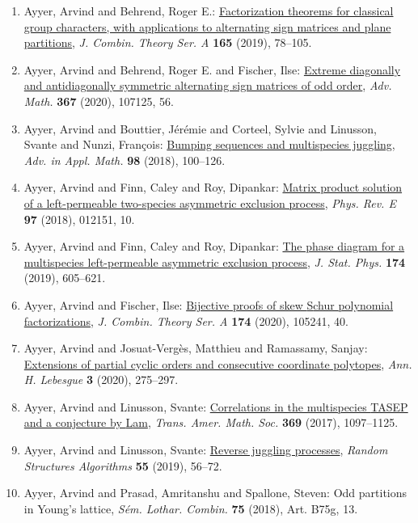 \begin{enumerate}
\item Ayyer, Arvind and Behrend, Roger E.: \href{https://doi.org/10.1016/j.jcta.2019.01.001}{Factorization theorems for classical group characters, with
applications to alternating sign matrices and plane
partitions}, \emph{J. Combin. Theory Ser. A} {\bf 165} (2019), 78--105.
\item Ayyer, Arvind and Behrend, Roger E. and Fischer, Ilse: \href{https://doi.org/10.1016/j.aim.2020.107125}{Extreme diagonally and antidiagonally symmetric alternating
sign matrices of odd order}, \emph{Adv. Math.} {\bf 367} (2020), 107125, 56.
\item Ayyer, Arvind and Bouttier, J\'{e}r\'{e}mie and Corteel, Sylvie and
Linusson, Svante and Nunzi, Fran\c{c}ois: \href{https://doi.org/10.1016/j.aam.2018.03.001}{Bumping sequences and multispecies juggling}, \emph{Adv. in Appl. Math.} {\bf 98} (2018), 100--126.
\item Ayyer, Arvind and Finn, Caley and Roy, Dipankar: \href{https://doi.org/10.1103/physreve.97.012151}{Matrix product solution of a left-permeable two-species
asymmetric exclusion process}, \emph{Phys. Rev. E} {\bf 97} (2018), 012151, 10.
\item Ayyer, Arvind and Finn, Caley and Roy, Dipankar: \href{https://doi.org/10.1007/s10955-018-2183-x}{The phase diagram for a multispecies left-permeable asymmetric
exclusion process}, \emph{J. Stat. Phys.} {\bf 174} (2019), 605--621.
\item Ayyer, Arvind and Fischer, Ilse: \href{https://doi.org/10.1016/j.jcta.2020.105241}{Bijective proofs of skew {S}chur polynomial factorizations}, \emph{J. Combin. Theory Ser. A} {\bf 174} (2020), 105241, 40.
\item Ayyer, Arvind and Josuat-Verg\`es, Matthieu and Ramassamy,
Sanjay: \href{https://doi.org/10.5802/ahl.33}{Extensions of partial cyclic orders and consecutive coordinate
polytopes}, \emph{Ann. H. Lebesgue} {\bf 3} (2020), 275--297.
\item Ayyer, Arvind and Linusson, Svante: \href{https://doi.org/10.1090/tran/6806}{Correlations in the multispecies {TASEP} and a conjecture by
{L}am}, \emph{Trans. Amer. Math. Soc.} {\bf 369} (2017), 1097--1125.
\item Ayyer, Arvind and Linusson, Svante: \href{https://doi.org/10.1002/rsa.20825}{Reverse juggling processes}, \emph{Random Structures Algorithms} {\bf 55} (2019), 56--72.
\item Ayyer, Arvind and Prasad, Amritanshu and Spallone, Steven: Odd partitions in {Y}oung's lattice, \emph{S\'{e}m. Lothar. Combin.} {\bf 75} (2018), Art. B75g, 13.

\end{enumerate}

